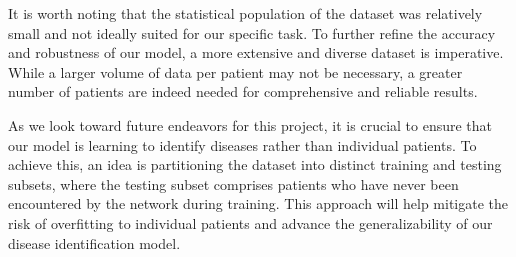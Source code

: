 \documentclass{article}
\begin{document}
It is worth noting that the statistical population of the dataset was relatively small and not ideally suited for our specific task. To further refine the accuracy and robustness of our model, a more extensive and diverse dataset is imperative. While a larger volume of data per patient may not be necessary, a greater number of patients are indeed needed for comprehensive and reliable results.

As we look toward future endeavors for this project, it is crucial to ensure that our model is learning to identify diseases rather than individual patients. To achieve this, an idea is partitioning the dataset into distinct training and testing subsets, where the testing subset comprises patients who have never been encountered by the network during training. This approach will help mitigate the risk of overfitting to individual patients and advance the generalizability of our disease identification model.




\end{document}
